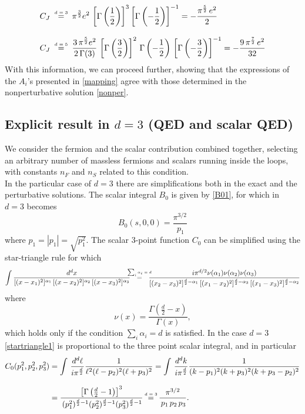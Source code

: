 \documentclass[a4paper,11pt,openright,twoside]{book}
\let\a=\alpha   \let\b=\beta   \let\g=\gamma   \let\d=\delta
\let\n=\nu      \let\x=\xi     \let\p=\pi      \let\r=\rho
\let\G=\Gamma  \let\D=\Delta \let\Q=\Theta  \let\L=\Lambda
\numberwithin{equation}{section}
\begin{document}
{{\begin{align}
	C_J&\ \ \mathrel{\stackrel{\makebox[0pt]{\mbox{\normalfont\tiny $d=3$}}}{=}}\ \ \p^\frac{3}{2}e^2\, \left[\G\left(\frac{1}{2}\right)\right]^3\left[\G\left(-\frac{1}{2}\right)\right]^{-1}=-\frac{\pi^\frac{5}{2}\,e^2}{2}\\[2ex]
	C_J&\ \ \mathrel{\stackrel{\makebox[0pt]{\mbox{\normalfont\tiny $d=5$}}}{=}}\ \ \frac{3\,\p^\frac{5}{2}e^2}{2\,\G(3)}\, \left[\G\left(\frac{3}{2}\right)\right]^2\,\G\left(-\frac{1}{2}\right)\,\left[\G\left(-\frac{3}{2}\right)\right]^{-1}=-\frac{9\,\pi^\frac{7}{2}\,e^2}{32}
\end{align}
With this information, we can proceed further, showing that 
the expressions of the $A_i$'s presented in \eqref{mapping} agree with those determined in the nonperturbative solution \eqref{nonper}. 

\subsection{Explicit result in $d=3$ (QED and scalar QED)}\label{explicitd3}

We consider the fermion and the scalar contribution combined together, selecting an arbitrary number of massless fermions and scalars running inside the loops, with constants $n_F$ and $n_S$ related to this condition. \\
In the particular case of $d=3$  there are simplifications both in the exact and the perturbative solutions. The scalar integral ${B}_0$ is given by \eqref{B01}, for which in $d=3$ becomes
\begin{equation}
	{B}_0(s,0,0)=\frac{\p^{3/2}}{\,p_1}\label{B01}
\end{equation}
where $p_1=|p_1|=\sqrt{p_1^2}$. The scalar 3-point function ${C}_0$ can be simplified using the star-triangle rule for which
\begin{equation}
	\int\frac{d^{d}x}{[(x-x_1)^2]^{\a_1}\,[(x-x_2)^2]^{\a_2}\,[(x-x_3)^2]^{\a_3}}\ \  \mathrel{\stackrel{\makebox[0pt]{\mbox{\normalfont\tiny $\sum_i\a_i=d$}}}{=}}\ \  \frac{i\pi^{d/2}\n(\a_1)\n(\a_2)\n(\a_3)}{[(x_2-x_3)^2]^{\frac{d}{2}-\a_1}\,[(x_1-x_2)^2]^{\frac{d}{2}-\a_3}\,[(x_1-x_3)^2]^{\frac{d}{2}-\a_2}}\label{startriangle1}
\end{equation}
where
\begin{equation}
	\n(x)=\frac{\G\left(\frac{d}{2}-x\right)}{\G(x)},
\end{equation}
which holds only if the condition $\sum_i\a_i=d$ is satisfied. In the case $d=3$  \eqref{startriangle1} is proportional to the three point scalar integral, and in particular
\begin{align}
	{C}_0(p_1^2,p_2^2,p_3^2)&=\int\,\frac{d^d\ell}{i\p^\frac{d}{2}}\frac{1}{\ell^2(\ell-p_2)^2(\ell+p_3)^2}=\int\,\frac{d^dk}{i\p^\frac{d}{2}}\frac{1}{(k-p_1)^2(k+p_3)^2(k+p_3-p_2)^2}\notag\\[2ex]
	&=\frac{\left[\G\left(\frac{d}{2}-1\right)\right]^3}{\,(p_1^2)^{\frac{d}{2}-1}(p_2^2)^{\frac{d}{2}-1}(p_3^2)^{\frac{d}{2}-1}}\ \mathrel{\stackrel{\makebox[0pt]{\mbox{\normalfont\tiny $d=3$}}}{=}}\ \frac{\p^{3/2}}{\,p_1\,p_2\,p_3}.\label{C01}
\end{align}

}}
\end{document}
